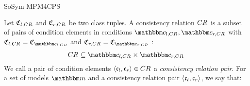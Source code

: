 \begin{copiedFrom}{SoSym MPM4CPS}
\begin{definition}
\label{def:consistencyrelation}
    Let $\mathfrak{C}_{l,CR_{}}$ and $\mathfrak{C}_{r,CR_{}}$ be two class tuples.
    A consistency relation $CR_{}$ is a subset of pairs of condition elements in conditions $\condition{c}{l,\consistencyrelation{CR}{}}, \condition{c}{r,\consistencyrelation{CR}{}}$ with
    $\classtuple{C}{l,\consistencyrelation{CR}{}} = \classtuple{C}{\condition{c}{l,\consistencyrelation{CR}{}}}$ and $\classtuple{C}{r,\consistencyrelation{CR}{}} = \classtuple{C}{\condition{c}{r,\consistencyrelation{CR}{}}}$ :
    \begin{align*}
        \formulaskip & 
        \consistencyrelation{CR}{} \subseteq \condition{c}{l,\consistencyrelation{CR}{}} \times \condition{c}{r,\consistencyrelation{CR}{}}
    \end{align*}
    We call a pair of condition elements %
    $\langle \mathfrak{c}_{l}, \mathfrak{c}_{r} \rangle \in CR_{}$ a \emph{consistency relation pair}. 
    For a set of models $\modelset{m}$ and a consistency relation pair $\langle \mathfrak{c}_{l}, \mathfrak{c}_{r} \rangle$, we say that:

\end{definition}
\end{copiedFrom}
